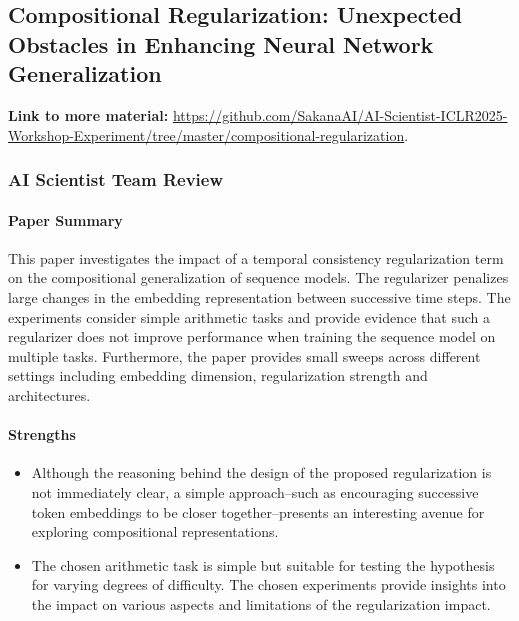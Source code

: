 \documentclass[11pt, a4paper]{include/gdm_format}
\begin{document}
\subsection{Compositional Regularization: Unexpected Obstacles in Enhancing Neural Network Generalization}

\begin{tcolorbox}[colback=blue!5!white, colframe=blue!75!black, title=Initial Idea]
{\scriptsize  }
\end{tcolorbox}

\textbf{Link to more material:} \url{https://github.com/SakanaAI/AI-Scientist-ICLR2025-Workshop-Experiment/tree/master/compositional-regularization}.


\label{paper:compos_reg}

%
\subsubsection{AI Scientist Team Review}

\paragraph{Paper Summary}

This paper investigates the impact of a temporal consistency regularization term on the compositional generalization of sequence models. The regularizer penalizes large changes in the embedding representation between successive time steps. The experiments consider simple arithmetic tasks and provide evidence that such a regularizer does not improve performance when training the sequence model on multiple tasks. Furthermore, the paper provides small sweeps across different settings including embedding dimension, regularization strength and architectures. 


\paragraph{Strengths}

\begin{itemize}
    \item Although the reasoning behind the design of the proposed regularization is not immediately clear, a simple approach--such as encouraging successive token embeddings to be closer together--presents an interesting avenue for exploring compositional representations.
    \item The chosen arithmetic task is simple but suitable for testing the hypothesis for varying degrees of difficulty. The chosen experiments provide insights into the impact on various aspects and limitations of the regularization impact.
\end{itemize}
\end{document}
